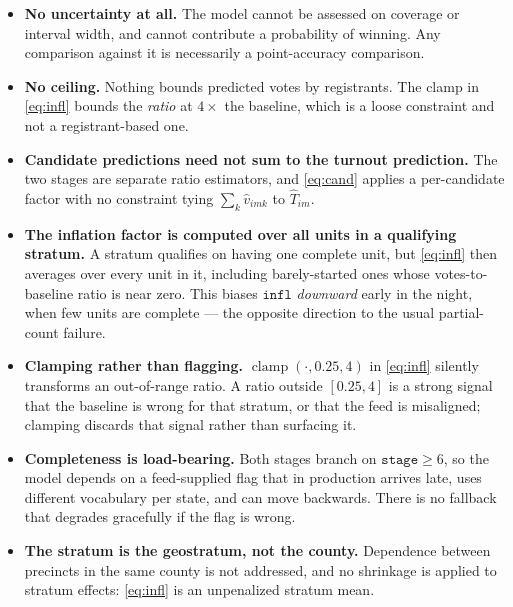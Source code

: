 \documentclass[11pt]{article}
\newcommand{\var}[1]{\texttt{#1}}
\newcommand{\clamp}{\operatorname{clamp}}
\begin{document}
\begin{itemize}
  \item \textbf{No uncertainty at all.} The model cannot be assessed on coverage or
        interval width, and cannot contribute a probability of winning. Any comparison
        against it is necessarily a point-accuracy comparison.
  \item \textbf{No ceiling.} Nothing bounds predicted votes by registrants. The clamp in
        \eqref{eq:infl} bounds the \emph{ratio} at $4\times$ the baseline, which is a
        loose constraint and not a registrant-based one.
  \item \textbf{Candidate predictions need not sum to the turnout prediction.} The two
        stages are separate ratio estimators, and \eqref{eq:cand} applies a per-candidate
        factor with no constraint tying $\sum_k \widehat{v}_{imk}$ to $\widehat{T}_{im}$.
  \item \textbf{The inflation factor is computed over all units in a qualifying
        stratum.} A stratum qualifies on having one complete unit, but \eqref{eq:infl}
        then averages over every unit in it, including barely-started ones whose
        votes-to-baseline ratio is near zero. This biases $\var{infl}$ \emph{downward}
        early in the night, when few units are complete --- the opposite direction to the
        usual partial-count failure.
  \item \textbf{Clamping rather than flagging.} $\clamp(\cdot, 0.25, 4)$ in
        \eqref{eq:infl} silently transforms an out-of-range ratio. A ratio outside
        $[0.25, 4]$ is a strong signal that the baseline is wrong for that stratum, or
        that the feed is misaligned; clamping discards that signal rather than surfacing
        it.
  \item \textbf{Completeness is load-bearing.} Both stages branch on
        $\var{stage} \geq 6$, so the model depends on a feed-supplied flag that in
        production arrives late, uses different vocabulary per state, and can move
        backwards. There is no fallback that degrades gracefully if the flag is wrong.
  \item \textbf{The stratum is the geostratum, not the county.} Dependence between
        precincts in the same county is not addressed, and no shrinkage is applied to
        stratum effects: \eqref{eq:infl} is an unpenalized stratum mean.
\end{itemize}
\end{document}
